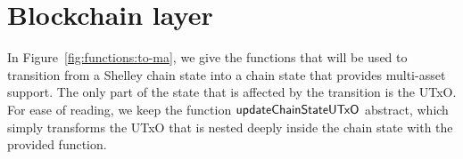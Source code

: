 \section{Blockchain layer}
\label{sec:chain}

\newcommand{\Proof}{\type{Proof}}
\newcommand{\Seedl}{\mathsf{Seed}_\ell}
\newcommand{\Seede}{\mathsf{Seed}_\eta}
\newcommand{\activeSlotCoeff}[1]{\fun{activeSlotCoeff}~ \var{#1}}
\newcommand{\slotToSeed}[1]{\fun{slotToSeed}~ \var{#1}}

\newcommand{\T}{\type{T}}
\newcommand{\vrf}[3]{\fun{vrf}_{#1} ~ #2 ~ #3}
\newcommand{\verifyVrf}[4]{\fun{verifyVrf}_{#1} ~ #2 ~ #3 ~#4}

\newcommand{\HashHeader}{\type{HashHeader}}
\newcommand{\HashBBody}{\type{HashBBody}}
\newcommand{\bhHash}[1]{\fun{bhHash}~ \var{#1}}
\newcommand{\bHeaderSize}[1]{\fun{bHeaderSize}~ \var{#1}}
\newcommand{\bSize}[1]{\fun{bSize}~ \var{#1}}
\newcommand{\bBodySize}[1]{\fun{bBodySize}~ \var{#1}}
\newcommand{\OCert}{\type{OCert}}
\newcommand{\BHeader}{\type{BHeader}}
\newcommand{\BHBody}{\type{BHBody}}

\newcommand{\bheader}[1]{\fun{bheader}~\var{#1}}
\newcommand{\hsig}[1]{\fun{hsig}~\var{#1}}
\newcommand{\bprev}[1]{\fun{bprev}~\var{#1}}
\newcommand{\bhash}[1]{\fun{bhash}~\var{#1}}
\newcommand{\bvkcold}[1]{\fun{bvkcold}~\var{#1}}
\newcommand{\bseedl}[1]{\fun{bseed}_{\ell}~\var{#1}}
\newcommand{\bprfn}[1]{\fun{bprf}_{n}~\var{#1}}
\newcommand{\bseedn}[1]{\fun{bseed}_{n}~\var{#1}}
\newcommand{\bprfl}[1]{\fun{bprf}_{\ell}~\var{#1}}
\newcommand{\bocert}[1]{\fun{bocert}~\var{#1}}
\newcommand{\bnonce}[1]{\fun{bnonce}~\var{#1}}
\newcommand{\bleader}[1]{\fun{bleader}~\var{#1}}
\newcommand{\hBbsize}[1]{\fun{hBbsize}~\var{#1}}
\newcommand{\bbodyhash}[1]{\fun{bbodyhash}~\var{#1}}
\newcommand{\overlaySchedule}[4]{\fun{overlaySchedule}~\var{#1}~\var{#2}~{#3}~\var{#4}}

\newcommand{\PrtclState}{\type{PrtclState}}
\newcommand{\PrtclEnv}{\type{PrtclEnv}}
\newcommand{\OverlayEnv}{\type{OverlayEnv}}
\newcommand{\VRFState}{\type{VRFState}}
\newcommand{\NewEpochEnv}{\type{NewEpochEnv}}
\newcommand{\NewEpochState}{\type{NewEpochState}}
\newcommand{\PoolDistr}{\type{PoolDistr}}
\newcommand{\BBodyEnv}{\type{BBodyEnv}}
\newcommand{\BBodyState}{\type{BBodyState}}
\newcommand{\RUpdEnv}{\type{RUpdEnv}}
\newcommand{\ChainEnv}{\type{ChainEnv}}
\newcommand{\ChainState}{\type{ChainState}}
\newcommand{\ChainSig}{\type{ChainSig}}

In Figure~\ref{fig:functions:to-ma}, we give the functions that will be used
to transition from a Shelley chain state into a chain state that provides multi-asset support.
The only part of the state that is affected by the transition is the UTxO. For ease of
reading, we keep the function $\mathsf{updateChainStateUTxO}$ abstract, which simply transforms the
UTxO that is nested deeply inside the chain state with the provided function.

